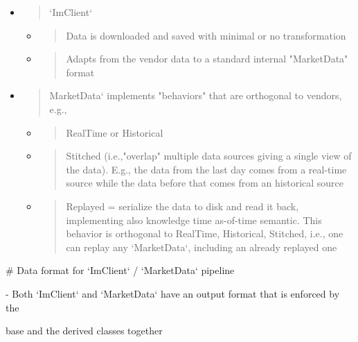 \documentclass[11pt, reqno]{amsart}
\begin{document}
\begin{itemize}
\item
  \begin{quote}
  `ImClient`
  \end{quote}

  \begin{itemize}
  \item
    \begin{quote}
    Data is downloaded and saved with minimal or no transformation
    \end{quote}
  \item
    \begin{quote}
    Adapts from the vendor data to a standard internal "MarketData"
    format
    \end{quote}
  \end{itemize}
\item
  \begin{quote}
  MarketData` implements "behaviors" that are orthogonal to vendors,
  e.g.,
  \end{quote}

  \begin{itemize}
  \item
    \begin{quote}
    RealTime or Historical
    \end{quote}
  \item
    \begin{quote}
    Stitched (i.e.,"overlap" multiple data sources giving a single view
    of the data). E.g., the data from the last day comes from a
    real-time source while the data before that comes from an historical
    source
    \end{quote}
  \item
    \begin{quote}
    Replayed = serialize the data to disk and read it back, implementing
    also knowledge time as-of-time semantic. This behavior is orthogonal
    to RealTime, Historical, Stitched, i.e., one can replay any
    `MarketData`, including an already replayed one
    \end{quote}
  \end{itemize}
\end{itemize}

\# Data format for `ImClient` / `MarketData` pipeline

- Both `ImClient` and `MarketData` have an output format that is
enforced by the

base and the derived classes together
\end{document}
